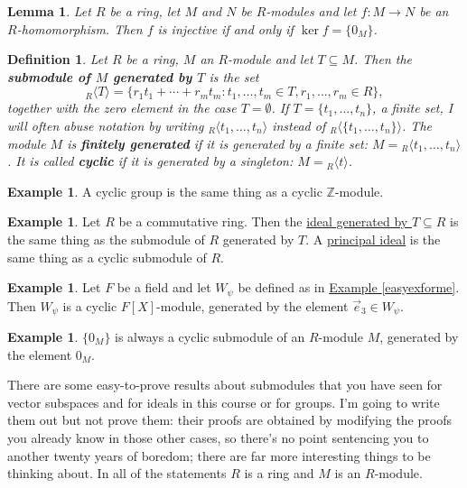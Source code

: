 \documentclass[11pt]{amsbook}
\newtheorem{definition}[theorem]{Definition}
\newtheorem{lemma}[theorem]{Lemma}
\theoremstyle{definition}
\newtheorem{ex}[theorem]{Example}
\begin{document}
\begin{lemma} \label{injmodule} Let $R$ be a ring, let $M$ and $N$ be $R$-modules and let $f: M \to N$ be an $R$-homomorphism. Then $f$ is injective if and only if $\ker f = \{ 0_M \}$. \end{lemma}

\begin{definition} Let $R$ be a ring, $M$ an $R$-module and let $T \subseteq M$. Then the {\bf submodule of $M$ generated by $T$} is the set $${}_R\langle T \rangle =  \{  r_1t_1 + \cdots + r_mt_m : t_1, \ldots , t_m \in T, r_1, \ldots , r_m\in R\},$$ together with the zero element in the case $T =\emptyset$. If $T = \{t_1, \ldots , t_n \}$, a finite set, I will often abuse notation by writing ${}_R\langle t_1, \ldots , t_n \rangle$ instead of ${}_R\langle \{ t_1, \ldots , t_n \}\rangle$. The module $M$ is {\bf finitely generated} if it is generated by a finite set: $M = {}_R\langle t_1, \ldots , t_n \rangle$. It is called {\bf cyclic} if it is generated by a singleton: $M = {}_R\langle t \rangle$.
\end{definition}

\begin{ex} A cyclic group is the same thing as a cyclic $\mathbb{Z}$-module. \end{ex}

\begin{ex} Let $R$ be a commutative ring. Then the \hyperref[genideals]{ideal generated by $T\subseteq R$} is the same thing as the submodule of $R$ generated by $T$. A \hyperref[prindef]{principal ideal} is the same thing as a cyclic submodule of $R$.
\end{ex}

\begin{ex}
Let $F$ be a field and let $W_{\psi}$ be defined as in \hyperref[easyexforme]{Example \ref{easyexforme}}. Then $W_{\psi}$ is a cyclic $F[X]$-module, generated by the element $\vec{e}_3\in W_{\psi}$.\end{ex}

\begin{ex}  $\{0_M \}$ is always a cyclic submodule of an $R$-module $M$, generated by the element $0_M$.
\end{ex}

There are some easy-to-prove results about submodules that you have seen for vector subspaces and for ideals in this course or for groups. I'm going to write them out but not prove them: their proofs are obtained by modifying the proofs you already know in those other cases, so there's no point sentencing you to another twenty years of boredom; there are far more interesting things to be thinking about. In all of the statements $R$ is a ring and $M$ is an $R$-module.
\end{document}
